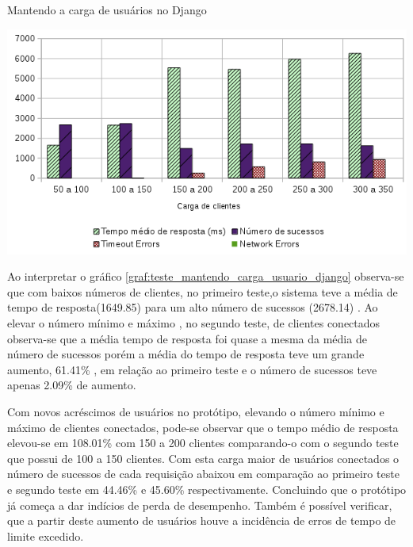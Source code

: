   \begin{grafico}[H]
    \setlength{\abovecaptionskip}{5pt}
    \setlength{\belowcaptionskip}{0pt}

    \caption[Mantendo a carga de usuários no Django]
	    {Mantendo a carga de usuários no Django}
    \centering
    \includegraphics[width=.80\textwidth]{imagem/graficos/grafico_django_plano_de_teste_3.png}
    \captionsetup[grafico]{justification=centering}
    \label{graf:teste_mantendo_carga_usuario_django}
  \end{grafico}

  Ao interpretar o gráfico \ref{graf:teste_mantendo_carga_usuario_django}  observa-se que com baixos números de clientes, no primeiro
  teste,o sistema teve a média de tempo de resposta(1649.85) para um alto número de sucessos (2678.14) . Ao elevar o número mínimo e máximo
  , no segundo teste, de clientes conectados observa-se que a média tempo de resposta foi quase a mesma da média de número de sucessos porém
  a média do tempo de resposta teve um grande aumento, 61.41\% , em relação ao primeiro teste e o número de sucessos teve apenas
  2.09\% de aumento.

  Com novos acréscimos de usuários no protótipo, elevando o número mínimo e máximo de clientes conectados, pode-se observar que o
  tempo médio de resposta elevou-se em 108.01\% com 150 a 200 clientes comparando-o com o segundo teste que possui de 100 a 150 clientes.
  Com esta carga maior de usuários conectados o número de sucessos de cada requisição abaixou em comparação ao primeiro teste e segundo
  teste em 44.46\% e 45.60\% respectivamente. Concluindo que o protótipo já começa a dar indícios de perda de desempenho. Também é possível
  verificar, que a partir deste aumento de usuários houve a incidência de erros de tempo de limite excedido.

